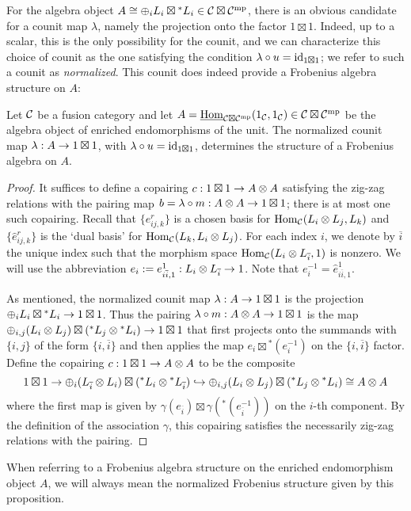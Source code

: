 \documentclass{amsart}
\begin{document}
For the algebra object $A \cong \oplus_i L_i \boxtimes {}^* L_i \in \mathcal C \boxtimes \mathcal C^{\mathrm{mp}}$, there is an obvious candidate for a counit map $\lambda$, namely the projection onto the factor $1 \boxtimes 1$.  Indeed, up to a scalar, this is the only possibility for the counit, and we can characterize this choice of counit as the one satisfying the condition $\lambda \circ u = \mathrm{id}_{1 \boxtimes 1}$; we refer to such a counit as \emph{normalized}.  This counit does indeed provide a Frobenius algebra structure on $A$:
\begin{proposition}
Let $\mathcal C$ be a fusion category and let $A = \operatorname{\underline{Hom}}_{\mathcal C \boxtimes \mathcal C^{\mathrm{mp}}}(1_\mathcal C,1_\mathcal C) \in \mathcal C \boxtimes \mathcal C^{\mathrm{mp}}$ be the algebra object of enriched endomorphisms of the unit.  The normalized counit map $\lambda: A \rightarrow 1 \boxtimes 1$, with $\lambda \circ u = \mathrm{id}_{1 \boxtimes 1}$, determines the structure of a Frobenius algebra on $A$.
\end{proposition}
\begin{proof}
It suffices to define a copairing $c : 1 \boxtimes 1 \rightarrow A \otimes A$ satisfying the zig-zag relations with the pairing map $b = \lambda \circ m : A \otimes A \rightarrow 1 \boxtimes 1$; there is at most one such copairing.  Recall that $\{e^r_{ij,k}\}$ is a chosen basis for $\operatorname{Hom}_\mathcal C(L_i \otimes L_j,L_k)$ and $\{\hat{e}^r_{ij,k}\}$ is the `dual basis' for $\operatorname{Hom}_\mathcal C(L_k,L_i \otimes L_j)$.  For each index $i$, we denote by $\overline{i}$ the unique index such that the morphism space $\operatorname{Hom}_\mathcal C(L_i \otimes L_{\overline{i}},1)$ is nonzero.  We will use the abbreviation $e_i := e^1_{i\overline{i},1} : L_i \otimes L_{\overline{i}} \rightarrow 1$.  Note that $e_i^{-1} = \hat{e}^1_{i\overline{i},1}$.

As mentioned, the normalized counit map $\lambda: A \rightarrow 1 \boxtimes 1$ is the projection $\oplus_i L_i \boxtimes {}^* L_i \rightarrow 1 \boxtimes 1$.  Thus the pairing $\lambda \circ m: A \otimes A \rightarrow 1 \boxtimes 1$ is the map $\oplus_{i,j} (L_i \otimes L_j) \boxtimes ({}^* L_j \otimes {}^* L_i) \rightarrow 1 \boxtimes 1$ that first projects onto the summands with $\{i,j\}$ of the form $\{i,\overline{i}\}$ and then applies the map $e_i \boxtimes {}^* (e_i^{-1})$ on the $\{i,\overline{i}\}$ factor.  Define the copairing $c : 1 \boxtimes 1 \rightarrow A \otimes A$ to be the composite
\[
1 \boxtimes 1 \rightarrow \oplus_i (L_{\overline{i}} \otimes L_i) \boxtimes ({}^* L_i \otimes {}^* L_{\overline{i}}) \hookrightarrow \oplus_{i,j}  (L_i \otimes L_j) \boxtimes ({}^* L_j \otimes {}^* L_i) \cong A \otimes A
\]
where the first map is given by $\gamma(e_{\overline{i}}) \boxtimes \gamma({}^*(e_{\overline{i}}^{-1}))$ on the $i$-th component.  By the definition of the association $\gamma$, this copairing satisfies the necessarily zig-zag relations with the pairing.
\end{proof}
\nid When referring to a Frobenius algebra structure on the enriched endomorphism object $A$, we will always mean the normalized Frobenius structure given by this proposition.
\end{document}
